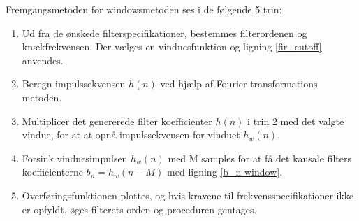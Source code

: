 Fremgangsmetoden for windowsmetoden ses i de følgende 5 trin:
\begin{enumerate}
	\item Ud fra de ønskede filterspecifikationer, bestemmes filterordenen og knækfrekvensen. Der vælges en vinduesfunktion og ligning \ref{fir_cutoff} anvendes.
	\item Beregn impulssekvensen $h(n)$ ved hjælp af Fourier transformations metoden.
	\item Multiplicer det genererede filter koefficienter $h(n)$ i trin 2 med det valgte vindue, for at at opnå impulssekvensen for vinduet $h_w(n)$.
	\item Forsink vinduesimpulsen $h_w(n)$ med M samples for at få det kausale filters koefficienterne $b_n = h_w(n-M)$ med ligning \ref{b_n-window}.
	\item Overføringsfunktionen plottes, og hvis kravene til frekvensspecifikationer ikke er opfyldt, øges filterets orden og proceduren gentages.
\end{enumerate}